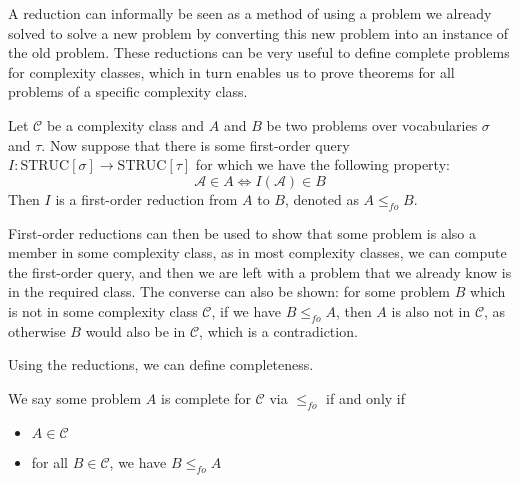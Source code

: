 A reduction can informally be seen as a method of using a problem we already solved to solve a new problem by converting this new problem into an instance of the old problem.
These reductions can be very useful to define complete problems for complexity classes, which in turn enables us to prove theorems for all problems of a specific complexity class.

\begin{define}
    Let $\mathcal{C}$ be a complexity class and $A$ and $B$ be two problems over vocabularies $\sigma$ and $\tau$.
    Now suppose that there is some first-order query $I: \text{STRUC}[\sigma] \to \text{STRUC}[\tau]$ for which we have the following property:
    \[
        \mathcal{A} \in A \Leftrightarrow I(\mathcal{A}) \in B
    \]
    Then $I$ is a first-order reduction from $A$ to $B$, denoted as $A \leq_{fo} B$.
\end{define}

First-order reductions can then be used to show that some problem is also a member in some complexity class, as in most complexity classes, we can compute the first-order query, and then we are left with a problem that we already know is in the required class.
The converse can also be shown: for some problem $B$ which is not in some complexity class $\mathcal{C}$, if we have $B \leq_{fo} A$, then $A$ is also not in $\mathcal{C}$, as otherwise $B$ would also be in $\mathcal{C}$, which is a contradiction.

Using the reductions, we can define completeness.

\begin{define}
    We say some problem $A$ is complete for $\mathcal{C}$ via $\leq_{fo}$ if and only if
    \begin{itemize}
        \setlength\itemsep{0.15em}
        \item $A \in \mathcal{C}$
        \item for all $B \in \mathcal{C}$, we have $B \leq_{fo} A$
    \end{itemize}
\end{define}

